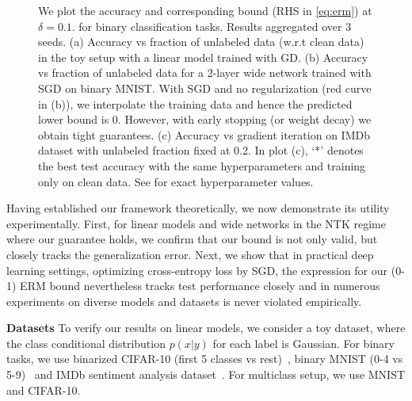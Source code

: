 \begin{figure*}[t!]
    \centering 
    \hfil
    \hfil
    \vspace{-5pt}
    \caption{ 
    We plot the accuracy and corresponding bound 
    (RHS in \eqref{eq:erm}) at $\delta = 0.1$. 
    for binary classification tasks. 
    Results aggregated over $3  $ seeds. 
    (a) Accuracy vs fraction of unlabeled data (w.r.t clean data) 
    in the toy setup with a linear model trained with GD. 
    (b) Accuracy vs fraction of unlabeled data 
    for a 2-layer wide network trained with SGD on binary MNIST. 
    With SGD and no regularization (red curve in (b)),
    we interpolate the training data 
    and hence the predicted lower bound is $0$. 
    However, with early stopping (or weight decay) 
    we obtain tight guarantees. 
    (c) Accuracy vs gradient iteration on IMDb dataset 
    with unlabeled fraction fixed at 0.2. 
    In plot (c), `*' denotes the best test accuracy 
    with the same hyperparameters 
    and training only on clean data. 
    See  for exact hyperparameter values. }
    \label{fig:error_binary}
    \vspace{-5pt}
\end{figure*}


Having established our framework theoretically, 
we now demonstrate its utility experimentally.
First, for linear models and wide networks 
in the NTK regime where our guarantee holds,
we confirm that our bound is not only valid, 
but closely tracks the generalization error.
Next, we show that in practical deep learning settings,
optimizing cross-entropy loss by SGD,
the expression for our (0-1) ERM bound 
nevertheless tracks test performance closely
and in numerous experiments
on diverse models and datasets
is never violated empirically. 
\vspace{5pt}

\noindent \textbf{Datasets {} {}} 
To verify our results on linear models,
we consider a toy dataset,
where the class conditional distribution $p(x|y)$
for each label is Gaussian.
For binary tasks, we use binarized CIFAR-10 (first 5 classes vs rest)~\citep{krizhevsky2009learning}, 
binary MNIST (0-4 vs 5-9)~\citep{lecun1998mnist}
and IMDb sentiment analysis dataset~\citep{maas2011learning}. 
For multiclass setup, we use MNIST and CIFAR-10.   
\vspace{5pt}

